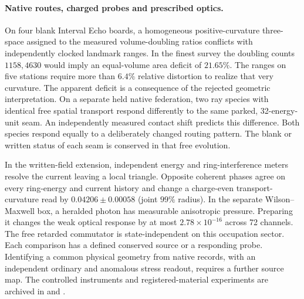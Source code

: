 \documentclass[11pt]{article}
\begin{document}
\paragraph{Native routes, charged probes and prescribed optics.}
On four blank Interval Echo boards, a homogeneous positive-curvature
three-space assigned to the measured volume-doubling ratios conflicts
with independently clocked landmark ranges. In the finest survey the
doubling counts $1158,4630$ would imply an equal-volume area deficit of
$21.65\%$. The ranges on five stations require more than $6.4\%$
relative distortion to realize that very curvature. The apparent
deficit is a consequence of the rejected geometric interpretation.
On a separate held native federation, two ray species with identical
free spatial transport respond differently to the same parked,
32-energy-unit seam. An independently measured contact shift predicts
this difference. Both species respond equally to a deliberately
changed routing pattern. The blank or written status of each seam is
conserved in that free evolution.

In the written-field extension, independent energy and ring-interference
meters resolve the current leaving a local triangle. Opposite coherent
phases agree on every ring-energy and current history and change a
charge-even transport-curvature read by $0.04206\pm0.00058$ (joint
$99\%$ radius). In the separate Wilson--Maxwell box, a heralded
photon has measurable anisotropic pressure. Preparing it changes the
weak optical response by at most $2.78\times10^{-16}$ across 72
channels. The free retarded commutator is state-independent on this
occupation sector. Each comparison has a defined conserved source
or a responding probe. Identifying a common physical geometry from
native records, with an independent ordinary and anomalous stress
readout, requires a further source map. The controlled instruments
and registered-material experiments are archived in
 and
.
\end{document}

